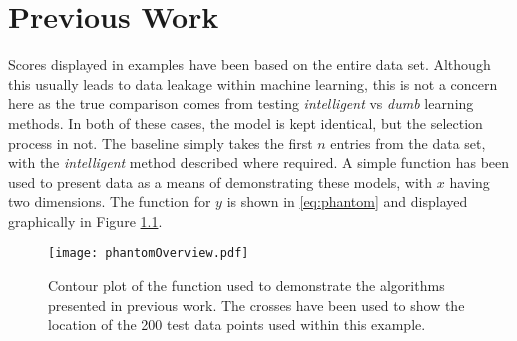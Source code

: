 
\chapter{Previous Work}
\label{ch:2}

\graphicspath{{Chapter2/Figs/Vector/}{Chapter2/Figs/Raster/}}









Scores displayed in examples have been based on the entire data set. Although this usually leads to data leakage within machine learning, this is not a concern here as the true comparison comes from testing  \textit{intelligent} vs \textit{dumb} learning methods. In both of these cases, the model is kept identical, but the selection process in not. The baseline simply takes the first $n$ entries from the data set, with the \textit{intelligent} method described where required. A simple function has been used to present data as a means of demonstrating these models, with $x$ having two dimensions. The function for $y$ is shown in \ref{eq:phantom} and displayed graphically in Figure \ref{fig:phantom}.


\begin{figure}[H]
  \begin{center}
    \texttt{[image: phantomOverview.pdf]}
    \caption[Example Dataset for Representation of Ideas]{Contour plot of the function used to demonstrate the algorithms presented in previous work. The crosses have been used to show the location of the 200 test data points used within this example.}
    \label{fig:phantom}
  \end{center}
\end{figure}

